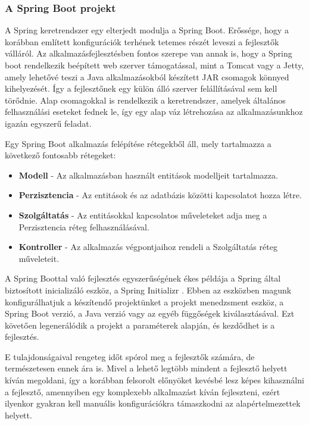 \documentclass[12pt]{article}
\begin{document}
\subsubsection{A Spring Boot projekt}

A Spring keretrendszer egy elterjedt modulja a Spring Boot. Erőssége, hogy a korábban említett konfigurációk terhének tetemes részét leveszi a fejlesztők válláról. Az alkalmazásfejlesztésben fontos szerepe van annak is, hogy a Spring boot rendelkezik beépített web szerver támogatással, mint a Tomcat vagy a Jetty, amely lehetővé teszi a Java alkalmazásokból készített JAR csomagok könnyed kihelyezését. Így a fejlesztőnek egy külön álló szerver felállításával sem kell törődnie. Alap csomagokkal is rendelkezik a keretrendszer, amelyek általános felhasználási eseteket fednek le, így egy alap váz létrehozása az alkalmazásunkhoz igazán egyszerű feladat.

Egy Spring Boot alkalmazás felépítése rétegekből áll, mely tartalmazza a következő fontosabb rétegeket:
\begin{itemize}
	\item[]\textbf{Modell}
	- Az alkalmazásban használt entitások modelljeit tartalmazza.
	\item[]\textbf{Perzisztencia}
	- Az entitások és az adatbázis közötti kapcsolatot hozza létre.
	\item[]\textbf{Szolgáltatás}
	- Az entitásokkal kapcsolatos műveleteket adja meg a Perzisztencia réteg felhasználásával.
	\item[]\textbf{Kontroller}
	- Az alkalmazás végpontjaihoz rendeli a Szolgáltatás réteg műveleteit.
\end{itemize}

A Spring Boottal való fejlesztés egyszerűségének ékes példája a Spring által biztosított inicializáló eszköz, a Spring Initializr \cite{SPRING_INIT}. Ebben az eszközben magunk konfigurálhatjuk a készítendő projektünket a projekt menedzsment eszköz, a Spring Boot verzió, a Java verzió vagy az egyéb függőségek kiválasztásával. Ezt követően legenerálódik a projekt a paraméterek alapján, és kezdődhet is a fejlesztés.

E tulajdonságaival rengeteg időt spórol meg a fejlesztők számára, de természetesen ennek ára is. Mivel a lehető legtöbb mindent a fejlesztő helyett kíván megoldani, így a korábban felsorolt előnyöket kevésbé lesz képes kihasználni a fejlesztő, amennyiben egy komplexebb alkalmazást kíván fejleszteni, ezért ilyenkor gyakran kell manuális konfigurációkra támaszkodni az alapértelmezettek helyett.
\end{document}
